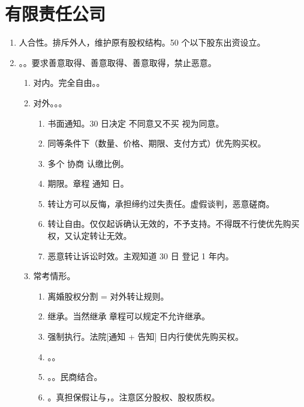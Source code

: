 \section{有限责任公司}
\begin{enumerate}
  \item 人合性。排斥外人，维护原有股权结构。50 个以下股东出资设立。
  \item {}。。要求善意取得、善意取得、善意取得，禁止恶意。
        \begin{enumerate}
          \item 对内。完全自由。。
          \item 对外。。。
                \begin{enumerate}
                  \item 书面通知。30 日决定 \yjt 不同意又不买 \yjt 视为同意。
                  \item 同等条件下（数量、价格、期限、支付方式）优先购买权。
                  \item 多个 \yjt 协商 \yjt 认缴比例。
                  \item 期限。章程 \yjt 通知  日。
                  \item 转让方可以反悔，承担缔约过失责任。虚假谈判，恶意磋商。
                  \item 转让自由。仅仅起诉确认无效的，不予支持。不得既不行使优先购买权，又认定转让无效。
                  \item 恶意转让诉讼时效。主观知道 30 日 \hz 登记 1 年内。
                \end{enumerate}
          \item 常考情形。
                \begin{enumerate}
                  \item 离婚股权分割 = 对外转让规则。
                  \item 继承。当然继承 \yjt 章程可以规定不允许继承。
                  \item 强制执行。法院[通知 + 告知]  日内行使优先购买权。
                  \item {}。。
                  \item {}。。民商结合。
                  \item {}。真担保假让与，。注意区分股权、股权质权。

\end{enumerate}
\end{enumerate}
\end{enumerate}
